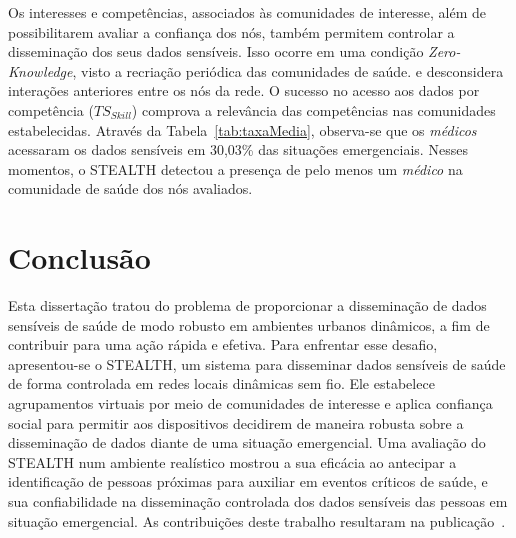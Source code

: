 \documentclass[12pt]{article}
\newcommand{\as}[1]{\textcolor{blue}{{\bf #1}}}
\newcommand{\agn}[1]{\textcolor{auburn}{#1}}
\begin{document}
Os interesses e competências, associados às comunidades de interesse, além de possibilitarem avaliar a confiança dos nós, também permitem controlar a disseminação dos seus dados sensíveis. Isso ocorre em uma condição \textit{Zero-Knowledge},
visto a recriação periódica das comunidades de saúde.
e desconsidera interações anteriores entre os nós da rede. O sucesso no acesso aos dados por competência ($TS_{Skill}$) comprova a relevância
das competências nas comunidades estabelecidas. Através da Tabela~\ref{tab:taxaMedia}, observa-se que os \textit{médicos} acessaram os dados sensíveis em 30,03\% das situações emergenciais. Nesses momentos, o \mbox{STEALTH} detectou a presença de pelo menos um \textit{médico} na comunidade de saúde dos nós avaliados.

\vspace{-0.2cm}

\section{Conclusão}
\label{sec:conc}

Esta dissertação tratou do problema de proporcionar a disseminação de dados sensíveis de saúde de modo robusto em ambientes urbanos dinâmicos, a fim de contribuir para uma ação rápida e efetiva.
\agn{Para enfrentar esse desafio,}
apresentou-se o \mbox{STEALTH}, um sistema para disseminar dados sensíveis de saúde de forma controlada em redes locais dinâmicas sem fio. Ele estabelece agrupamentos virtuais por meio de comunidades de interesse e aplica confiança social para permitir aos dispositivos decidirem de maneira robusta sobre a disseminação de dados diante de uma situação emergencial. Uma avaliação do \mbox{STEALTH} num ambiente realístico mostrou a sua eficácia ao antecipar a identificação de pessoas próximas para auxiliar em eventos críticos de saúde, e sua confiabilidade na disseminação controlada dos dados sensíveis das pessoas em situação emergencial. As contribuições deste trabalho resultaram na publicação~\cite{batista2019sbseg}.




\small


\end{document}
